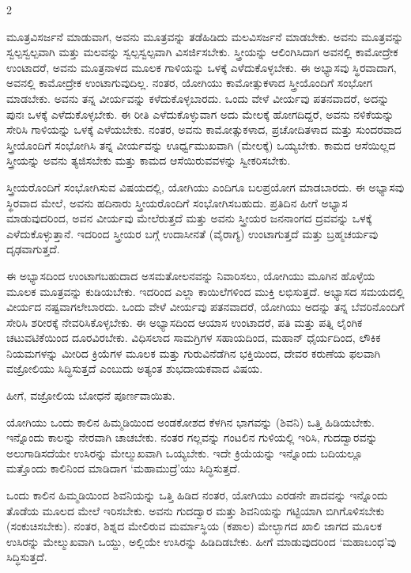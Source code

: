 \begin{multicols}{2}
\begin{kan}
ಮೂತ್ರವಿಸರ್ಜನೆ ಮಾಡುವಾಗ, ಅವನು ಮೂತ್ರವನ್ನು ತಡೆಹಿಡಿದು ಮಲವಿಸರ್ಜನೆ ಮಾಡಬೇಕು. ಅವನು ಮೂತ್ರವನ್ನು ಸ್ವಲ್ಪಸ್ವಲ್ಪವಾಗಿ ಮತ್ತು ಮಲವನ್ನು ಸ್ವಲ್ಪಸ್ವಲ್ಪವಾಗಿ ವಿಸರ್ಜಿಸಬೇಕು. ಸ್ತ್ರೀಯನ್ನು ಆಲಿಂಗಿಸಿದಾಗ ಅವನಲ್ಲಿ ಕಾಮೋದ್ರೇಕ ಉಂಟಾದರೆ, ಅವನು ಮೂತ್ರನಾಳದ ಮೂಲಕ ಗಾಳಿಯನ್ನು ಒಳಕ್ಕೆ ಎಳೆದುಕೊಳ್ಳಬೇಕು. ಈ ಅಭ್ಯಾಸವು ಸ್ಥಿರವಾದಾಗ, ಅವನಲ್ಲಿ ಕಾಮೋದ್ರೇಕ ಉಂಟಾಗುವುದಿಲ್ಲ. ನಂತರ, ಯೋಗಿಯು ಕಾಮೋತ್ಸುಕಳಾದ ಸ್ತ್ರೀಯೊಂದಿಗೆ ಸಂಭೋಗ ಮಾಡಬೇಕು. ಅವನು ತನ್ನ ವೀರ್ಯವನ್ನು ಕಳೆದುಕೊಳ್ಳಬಾರದು. ಒಂದು ವೇಳೆ ವೀರ್ಯವು ಪತನವಾದರೆ, ಅದನ್ನು ಪುನಃ ಒಳಕ್ಕೆ ಎಳೆದುಕೊಳ್ಳಬೇಕು. ಈ ರೀತಿ ಎಳೆದುಕೊಳ್ಳುವಾಗ ಅದು ಮೇಲಕ್ಕೆ ಹೋಗದಿದ್ದರೆ, ಅವನು ನಳಿಕೆಯನ್ನು ಸೇರಿಸಿ ಗಾಳಿಯನ್ನು ಒಳಕ್ಕೆ ಎಳೆಯಬೇಕು. ನಂತರ, ಅವನು ಕಾಮೋತ್ಸುಕಳಾದ, ಪ್ರಚೋದಿತಳಾದ ಮತ್ತು ಸುಂದರವಾದ ಸ್ತ್ರೀಯೊಂದಿಗೆ ಸಂಭೋಗಿಸಿ ತನ್ನ ವೀರ್ಯವನ್ನು ಊರ್ಧ್ವಮುಖವಾಗಿ (ಮೇಲಕ್ಕೆ) ಒಯ್ಯಬೇಕು. ಕಾಮದ ಆಸೆಯಿಲ್ಲದ ಸ್ತ್ರೀಯನ್ನು ಅವನು ತ್ಯಜಿಸಬೇಕು ಮತ್ತು ಕಾಮದ ಆಸೆಯಿರುವವಳನ್ನು ಸ್ವೀಕರಿಸಬೇಕು.

ಸ್ತ್ರೀಯರೊಂದಿಗೆ ಸಂಭೋಗಿಸುವ ವಿಷಯದಲ್ಲಿ, ಯೋಗಿಯು ಎಂದಿಗೂ ಬಲಪ್ರಯೋಗ ಮಾಡಬಾರದು. ಈ ಅಭ್ಯಾಸವು ಸ್ಥಿರವಾದ ಮೇಲೆ, ಅವನು ಹದಿನಾರು ಸ್ತ್ರೀಯರೊಂದಿಗೆ ಸಂಭೋಗಿಸಬಹುದು. ಪ್ರತಿದಿನ ಹೀಗೆ ಅಭ್ಯಾಸ ಮಾಡುವುದರಿಂದ, ಅವನ ವೀರ್ಯವು ಮೇಲೆರುತ್ತದೆ ಮತ್ತು ಅವನು ಸ್ತ್ರೀಯರ ಜನನಾಂಗದ ದ್ರವವನ್ನು ಒಳಕ್ಕೆ ಎಳೆದುಕೊಳ್ಳುತ್ತಾನೆ. ಇದರಿಂದ ಸ್ತ್ರೀಯರ ಬಗ್ಗೆ ಉದಾಸೀನತೆ (ವೈರಾಗ್ಯ) ಉಂಟಾಗುತ್ತದೆ ಮತ್ತು ಬ್ರಹ್ಮಚರ್ಯವು ದೃಢವಾಗುತ್ತದೆ.
\vskip 7pt


ಈ ಅಭ್ಯಾಸದಿಂದ ಉಂಟಾಗಬಹುದಾದ ಅಸಮತೋಲನವನ್ನು ನಿವಾರಿಸಲು, ಯೋಗಿಯು ಮೂಗಿನ ಹೊಳ್ಳೆಯ ಮೂಲಕ ಮೂತ್ರವನ್ನು ಕುಡಿಯಬೇಕು. ಇದರಿಂದ ಎಲ್ಲಾ ಕಾಯಿಲೆಗಳಿಂದ ಮುಕ್ತಿ ಲಭಿಸುತ್ತದೆ. ಅಭ್ಯಾಸದ ಸಮಯದಲ್ಲಿ ವೀರ್ಯದ ನಷ್ಟವಾಗಲೇಬಾರದು. ಒಂದು ವೇಳೆ ವೀರ್ಯವು ಪತನವಾದರೆ, ಯೋಗಿಯು ಅದನ್ನು ತನ್ನ ಬೆವರಿನೊಂದಿಗೆ ಸೇರಿಸಿ ಶರೀರಕ್ಕೆ ನೇವರಿಸಿಕೊಳ್ಳಬೇಕು. ಈ ಅಭ್ಯಾಸದಿಂದ ಆಯಾಸ ಉಂಟಾದರೆ, ಪತಿ ಮತ್ತು ಪತ್ನಿ ಲೈಂಗಿಕ ಚಟುವಟಿಕೆಯಿಂದ ದೂರವಿರಬೇಕು. ವಿಧಿಸಲಾದ ಸಾಮಗ್ರಿಗಳ ಸಹಾಯದಿಂದ, ಮಹಾನ್ ಧೈರ್ಯದಿಂದ, ಲೌಕಿಕ ನಿಯಮಗಳನ್ನು ಮೀರಿದ ಕ್ರಿಯೆಗಳ ಮೂಲಕ ಮತ್ತು ಗುರುವಿನೆಡೆಗಿನ ಭಕ್ತಿಯಿಂದ, ದೇವರ ಕರುಣೆಯ ಫಲವಾಗಿ ವಜ್ರೋಲಿಯು ಸಿದ್ಧಿಸುತ್ತದೆ ಎಂಬುದು ಅತ್ಯಂತ ಶುಭದಾಯಕವಾದ ವಿಷಯ.

ಹೀಗೆ, ವಜ್ರೋಲಿಯ ಬೋಧನೆ ಪೂರ್ಣವಾಯಿತು.
\vskip 7pt


ಯೋಗಿಯು ಒಂದು ಕಾಲಿನ ಹಿಮ್ಮಡಿಯಿಂದ ಅಂಡಕೋಶದ ಕೆಳಗಿನ ಭಾಗವನ್ನು (ಶಿವನಿ) ಒತ್ತಿ ಹಿಡಿಯಬೇಕು. ಇನ್ನೊಂದು ಕಾಲನ್ನು ನೇರವಾಗಿ ಚಾಚಬೇಕು. ನಂತರ ಗಲ್ಲವನ್ನು ಗಂಟಲಿನ ಗುಳಿಯಲ್ಲಿ ಇರಿಸಿ, ಗುದದ್ವಾರವನ್ನು ಅಲುಗಾಡಿಸದೆಯೇ ಉಸಿರನ್ನು ಮೇಲ್ಮುಖವಾಗಿ ಒಯ್ಯಬೇಕು. ಇದೇ ಕ್ರಿಯೆಯನ್ನು ಇನ್ನೊಂದು ಬದಿಯಲ್ಲೂ ಮತ್ತೊಂದು ಕಾಲಿನಿಂದ ಮಾಡಿದಾಗ ‘ಮಹಾಮುದ್ರೆ’ಯು ಸಿದ್ಧಿಸುತ್ತದೆ.
\vskip 7pt


ಒಂದು ಕಾಲಿನ ಹಿಮ್ಮಡಿಯಿಂದ ಶಿವನಿಯನ್ನು ಒತ್ತಿ ಹಿಡಿದ ನಂತರ, ಯೋಗಿಯು ಎರಡನೇ ಪಾದವನ್ನು ಇನ್ನೊಂದು ತೊಡೆಯ ಮೂಲದ ಮೇಲೆ ಇರಿಸಬೇಕು. ಅವನು ಗುದದ್ವಾರ ಮತ್ತು ಶಿವನಿಯನ್ನು ಗಟ್ಟಿಯಾಗಿ ಬಿಗಿಗೊಳಿಸಬೇಕು (ಸಂಕುಚಿಸಬೇಕು). ನಂತರ, ಶಿಶ್ನದ ಮೇಲಿರುವ ಮರ್ಮಾಸ್ಥಿಯ (ಕಪಾಲ) ಮೇಲ್ಭಾಗದ ಖಾಲಿ ಜಾಗದ ಮೂಲಕ ಉಸಿರನ್ನು ಮೇಲ್ಮುಖವಾಗಿ ಒಯ್ದು, ಅಲ್ಲಿಯೇ ಉಸಿರನ್ನು ಹಿಡಿದಿಡಬೇಕು. ಹೀಗೆ ಮಾಡುವುದರಿಂದ ‘ಮಹಾಬಂಧ’ವು ಸಿದ್ಧಿಸುತ್ತದೆ.
\vskip 7pt


\end{kan}
\end{multicols}
